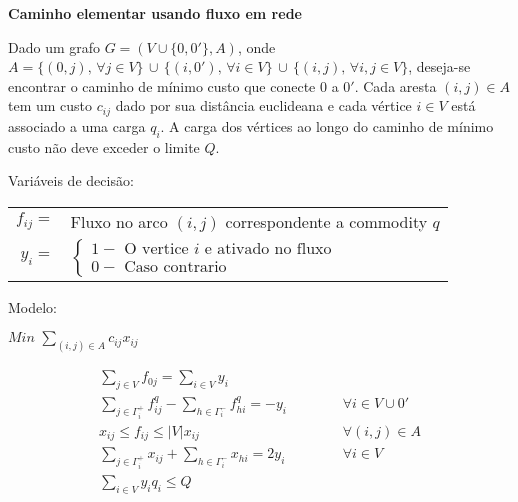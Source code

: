 \documentclass[12pt]{article}
\begin{document}
\begin{center}
\textbf{Caminho elementar usando fluxo em rede} \\
\end{center}
\vspace{0.4cm}

\noindent Dado um grafo $G=(V \cup \{0,0'\},A)$, onde $A = \{(0,j), \, \forall j \in V\} \, \cup \, \{(i,0'), \, \forall i \in V\} \, \cup \, \{(i,j), \, \forall i,j \in V\}$, deseja-se encontrar o caminho de m\'inimo custo que conecte $0$ a $0'$. Cada aresta $(i,j) \in A$ tem um custo $c_{ij}$ dado por sua dist\^ancia euclideana e cada v\'ertice $i \in V$ est\'a associado a uma carga $q_i$. A carga dos v\'ertices ao longo do caminho de m\'inimo custo n\~ ao deve exceder o limite $Q$.

\vspace{1cm}
Vari\'aveis de decis\~ao:
\begin{table}[!htb]
\centering
\begin{tabular}{rl}
$f_{ij} = $ & Fluxo no arco $(i,j)$ correspondente a commodity $q$ \\
$y_i = $ &
$\left\{
\begin{array} {l}
1 - \textrm{ O vertice } i \textrm{ e ativado no fluxo}  \\
0 - \textrm{ Caso contrario}
\end{array} \right.
$
\end{tabular}
\end{table}

\vspace{1cm}
Modelo:
\begin{center}
 $Min \,\, \sum\limits_{(i,j) \in A} {c_{ij} x_{ij}}$
\end{center}

\begin{eqnarray}
\label{eq01}
  \sum\limits_{j \in V} {f_{0j}} = \sum\limits_{i \in V}{y_i} \\
\label{eq02}
  \sum\limits_{j \in \Gamma^+_i} {f^q_{ij}} - \sum\limits_{h \in \Gamma^-_i}{f^q_{hi}} = -y_i & \hspace{1cm} &\forall i \in V \cup 0'\\
\label{eq03}
 x_{ij} \le f_{ij} \le |V| x_{ij} & \hspace{1cm} & \forall (i,j) \in A \\
\label{eq04}
  \sum\limits_{j \in \Gamma^+_i}{x_{ij}} + \sum\limits_{h \in \Gamma^-_i}{x_{hi}} = 2y_i & \hspace{1cm} & \forall i \in V \\
\label{eq05}
  \sum\limits_{i \in V} {y_i q_i} \le Q
\end{eqnarray}
\end{document}
